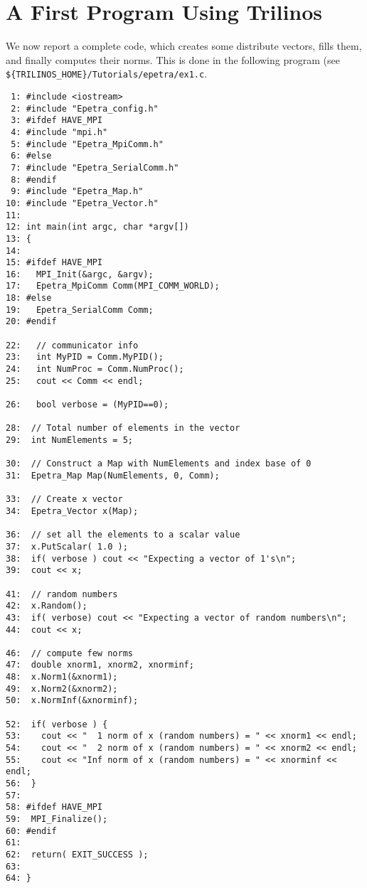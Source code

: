 


























\section{A First Program Using Trilinos}

We now report a complete code, which creates some distribute vectors,
fills them, and finally computes their norms. This is done in the
following program (see \verb!${TRILINOS_HOME}/Tutorials/epetra/ex1.c!.
\begin{verbatim}
 1: #include <iostream>
 2: #include "Epetra_config.h"
 3: #ifdef HAVE_MPI
 4: #include "mpi.h"
 5: #include "Epetra_MpiComm.h"
 6: #else
 7: #include "Epetra_SerialComm.h"
 8: #endif
 9: #include "Epetra_Map.h"
10: #include "Epetra_Vector.h"
11:
12: int main(int argc, char *argv[])
13: {
14: 
15: #ifdef HAVE_MPI
16:   MPI_Init(&argc, &argv);
17:   Epetra_MpiComm Comm(MPI_COMM_WORLD);
18: #else
19:   Epetra_SerialComm Comm;
20: #endif
  
22:   // communicator info
23:   int MyPID = Comm.MyPID();
24:   int NumProc = Comm.NumProc();
25:   cout << Comm << endl;

26:   bool verbose = (MyPID==0);

28:  // Total number of elements in the vector
29:  int NumElements = 5;

30:  // Construct a Map with NumElements and index base of 0
31:  Epetra_Map Map(NumElements, 0, Comm);

33:  // Create x vector
34:  Epetra_Vector x(Map);

36:  // set all the elements to a scalar value
37:  x.PutScalar( 1.0 );
38:  if( verbose ) cout << "Expecting a vector of 1's\n";
39:  cout << x;

41:  // random numbers
42:  x.Random();
43:  if( verbose) cout << "Expecting a vector of random numbers\n";
44:  cout << x;

46:  // compute few norms
47:  double xnorm1, xnorm2, xnorminf;
48:  x.Norm1(&xnorm1);
49:  x.Norm2(&xnorm2);
50:  x.NormInf(&xnorminf);

52:  if( verbose ) {
53:    cout << "  1 norm of x (random numbers) = " << xnorm1 << endl;
54:    cout << "  2 norm of x (random numbers) = " << xnorm2 << endl;
55:    cout << "Inf norm of x (random numbers) = " << xnorminf << endl;
56:  }
57:  
58: #ifdef HAVE_MPI
59:  MPI_Finalize();
60: #endif
61:
62:  return( EXIT_SUCCESS );
63:  
64: }
\end{verbatim}

